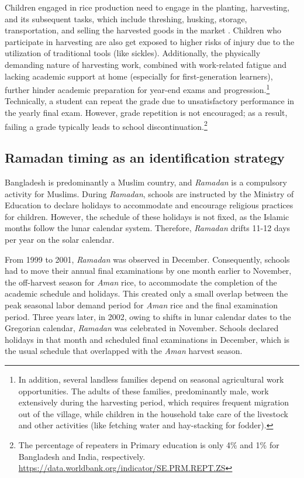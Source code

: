 \documentclass[12pt,letterpaper]{article}
\newcommand{\0}{\ensuremath{\mbox{\boldmath $0$}}}
\begin{document}
Children engaged in rice production need to engage in the planting, harvesting, and its subsequent tasks, which include threshing, husking, storage, transportation, and selling the harvested goods in the market \citep{chowdhury2009participatory}. Children who participate in harvesting are also get exposed to higher risks of injury due to the utilization of traditional tools (like sickles). Additionally, the physically demanding nature of harvesting work, combined with work-related fatigue and lacking academic support at home (especially for first-generation learners), further hinder academic preparation for year-end exams and progression.\footnote{In addition, several landless families depend on seasonal agricultural work opportunities. The adults of these families, predominantly male, work extensively during the harvesting period, which requires frequent migration out of the village, while children in the household take care of the livestock and other activities (like fetching water and hay-stacking for fodder).} Technically, a student can repeat the grade due to unsatisfactory performance in the yearly final exam. However, grade repetition is not encouraged; as a result, failing a grade typically leads to school discontinuation.\footnote{The percentage of repeaters in Primary education is only 4\% and 1\% for Bangladesh and India, respectively. \url{https://data.worldbank.org/indicator/SE.PRM.REPT.ZS}}


\subsection{Ramadan timing as an identification strategy}

Bangladesh is predominantly a Muslim country, and \textit{Ramadan} is a compulsory activity for Muslims. During \textit{Ramadan}, schools are instructed by the Ministry of Education to declare holidays to accommodate and encourage religious practices for children. However, the schedule of these holidays is not fixed, as the Islamic months follow the lunar calendar system. Therefore, \textit{Ramadan} drifts 11-12 days per year on the solar calendar.

From 1999 to 2001, \textit{Ramadan} was observed in December. Consequently, schools had to move their annual final examinations by one month earlier to November, the off-harvest season for \textit{Aman} rice, to accommodate the completion of the academic schedule and holidays. This created only a small overlap between the peak seasonal labor demand period for \textit{Aman} rice and the final examination period. Three years later, in 2002, owing to shifts in lunar calendar dates to the Gregorian calendar, \textit{Ramadan} was celebrated in November. Schools declared holidays in that month and scheduled final examinations in December, which is the usual schedule that overlapped with the \textit{Aman} harvest season. 
\end{document}
